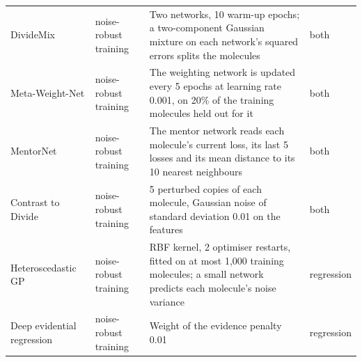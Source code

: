 {\begin{longtable}{@{}p{2.9cm}p{2.0cm}p{7.3cm}p{1.6cm}@{}}
DivideMix & noise-robust training & Two networks, 10 warm-up epochs; a two-component Gaussian mixture on each network's squared errors splits the molecules & both \\
Meta-Weight-Net & noise-robust training & The weighting network is updated every 5 epochs at learning rate 0.001, on 20\% of the training molecules held out for it & both \\
MentorNet & noise-robust training & The mentor network reads each molecule's current loss, its last 5 losses and its mean distance to its 10 nearest neighbours & both \\
Contrast to Divide & noise-robust training & 5 perturbed copies of each molecule, Gaussian noise of standard deviation 0.01 on the features & both \\
\midrule
Heteroscedastic GP & noise-robust training & RBF kernel, 2 optimiser restarts, fitted on at most 1{,}000 training molecules; a small network predicts each molecule's noise variance & regression \\
Deep evidential regression & noise-robust training & Weight of the evidence penalty 0.01 & regression \\
\bottomrule
\end{longtable}
}

